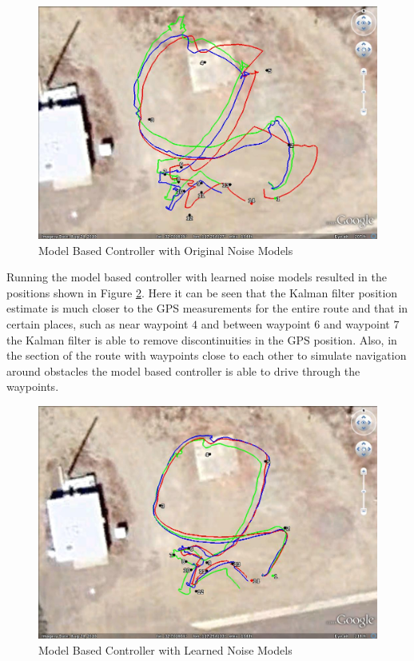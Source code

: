 \begin{figure}[ht!]
	\centering
	\includegraphics[width=.75\textwidth]{images/GE/20101203_1551_kf_lyapOrigQR}
	\caption{Model Based Controller with Original Noise Models}
	\label{fig:kfResults1}
\end{figure}

Running the model based controller with learned noise models resulted in the positions shown in Figure \ref{fig:kfResults2}. Here it can be seen that the Kalman filter position estimate is much closer to the GPS measurements for the entire route and that in certain places, such as near waypoint $4$ and between waypoint $6$ and waypoint $7$ the Kalman filter is able to remove discontinuities in the GPS position. Also, in the section of the route with waypoints close to each other to simulate navigation around obstacles the model based controller is able to drive through the waypoints.

\begin{figure}[ht!]
	\centering
	\includegraphics[width=.75\textwidth]{images/GE/20101203_1545_kf_lyapNewQR}
	\caption{Model Based Controller with Learned Noise Models}
	\label{fig:kfResults2}
\end{figure}

